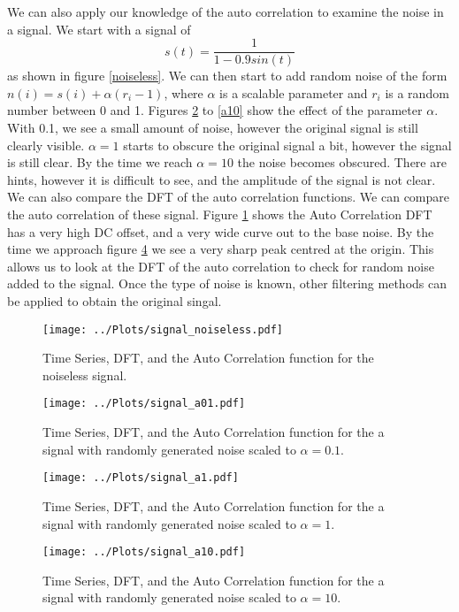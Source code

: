 We can also apply our knowledge of the auto correlation to examine the noise in a signal. 
We start with a signal of 
\begin{equation}
s(t) = \frac{1}{1-0.9sin(t)}
\end{equation}
as shown in figure \ref{noiseless}. 
We can then start to add random noise of the form $n(i) = s(i) + \alpha (r_{i} -1)$, where $\alpha$ is a scalable parameter and $r_{i}$ is a random number between 0 and 1. 
Figures \ref{fig:a01} to \ref{a10} show the effect of the parameter $\alpha$. 
With 0.1, we see a small amount of noise, however the original signal is still clearly visible. 
$\alpha = 1$ starts to obscure the original signal a bit, however the signal is still clear. 
By the time we reach $\alpha = 10$ the noise becomes obscured. 
There are hints, however it is difficult to see, and the amplitude of the signal is not clear. 
We can also compare the DFT of the auto correlation functions. 
We can compare the auto correlation of these signal. 
Figure \ref{fig:noiseless} shows the Auto Correlation DFT has a very high DC offset, and a very wide curve out to the base noise. 
By the time we approach figure \ref{fig:a10} we see a very sharp peak centred at the origin. 
This allows us to look at the DFT of the auto correlation to check for random noise added to the signal. 
Once the type of noise is known, other filtering methods can be applied to obtain the original singal.

\begin{figure}[ht]
    \centering
    \texttt{[image: ../Plots/signal\_noiseless.pdf]}
    \caption{Time Series, DFT, and the Auto Correlation function for the noiseless signal.}
    \label{fig:noiseless}
\end{figure}

\begin{figure}[ht]
    \centering
    \texttt{[image: ../Plots/signal\_a01.pdf]}
    \caption{Time Series, DFT, and the Auto Correlation function for the a signal with randomly generated noise scaled to $\alpha = 0.1$.}
    \label{fig:a01}
\end{figure}
\begin{figure}[ht]
    \centering
    \texttt{[image: ../Plots/signal\_a1.pdf]}
    \caption{Time Series, DFT, and the Auto Correlation function for the a signal with randomly generated noise scaled to $\alpha = 1$.}
    \label{fig:a1}
\end{figure}
\begin{figure}[ht]
    \centering
    \texttt{[image: ../Plots/signal\_a10.pdf]}
    \caption{Time Series, DFT, and the Auto Correlation function for the a signal with randomly generated noise scaled to $\alpha = 10$.}
    \label{fig:a10}
\end{figure}

